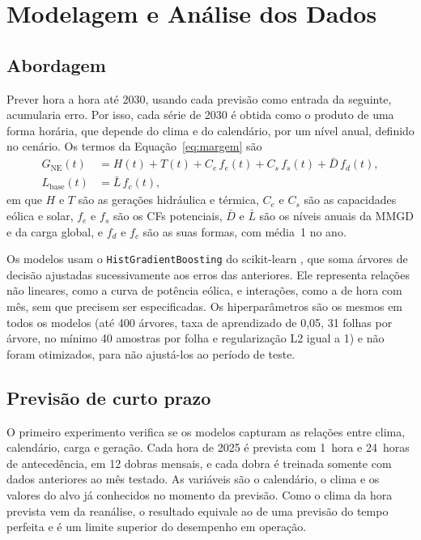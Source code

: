 \section{Modelagem e Análise dos Dados}
\label{sec:modelagem}

\subsection{Abordagem}
\label{sec:abordagem}

Prever hora a hora até 2030, usando cada previsão como entrada da seguinte, acumularia erro. Por isso, cada série de 2030 é obtida como o produto de uma forma horária, que depende do clima e do calendário, por um nível anual, definido no cenário. Os termos da Equação~\ref{eq:margem} são
\begin{align}
  G_{\mathrm{NE}}(t) &= H(t) + T(t) + C_e\, f_e(t) + C_s\, f_s(t) + \bar{D}\, f_d(t), \label{eq:geracao}\\
  L_{\mathrm{base}}(t) &= \bar{L}\, f_c(t), \label{eq:carga}
\end{align}
em que $H$ e $T$ são as gerações hidráulica e térmica, $C_e$ e $C_s$ são as capacidades eólica e solar, $f_e$ e $f_s$ são os CFs potenciais, $\bar{D}$ e $\bar{L}$ são os níveis anuais da MMGD e da carga global, e $f_d$ e $f_c$ são as suas formas, com média~1 no ano.

Os modelos usam o \texttt{HistGradientBoosting} do scikit-learn \parencite{pedregosa2011}, que soma árvores de decisão ajustadas sucessivamente aos erros das anteriores. Ele representa relações não lineares, como a curva de potência eólica, e interações, como a de hora com mês, sem que precisem ser especificadas. Os hiperparâmetros são os mesmos em todos os modelos (até 400 árvores, taxa de aprendizado de 0,05, 31 folhas por árvore, no mínimo 40 amostras por folha e regularização L2 igual a 1) e não foram otimizados, para não ajustá-los ao período de teste.

\subsection{Previsão de curto prazo}
\label{sec:curtoprazo}

O primeiro experimento verifica se os modelos capturam as relações entre clima, calendário, carga e geração. Cada hora de 2025 é prevista com 1~hora e 24~horas de antecedência, em 12 dobras mensais, e cada dobra é treinada somente com dados anteriores ao mês testado. As variáveis são o calendário, o clima e os valores do alvo já conhecidos no momento da previsão. Como o clima da hora prevista vem da reanálise, o resultado equivale ao de uma previsão do tempo perfeita e é um limite superior do desempenho em operação.


